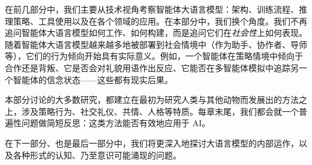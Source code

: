 在前几部分中，我们主要从技术视角考察智能体大语言模型：架构、训练流程、推理策略、工具使用以及在各个领域的应用。在本部分中，我们换个角度。我们不再追问智能体大语言模型如何工作、如何构建，而是追问它们在{\em 社会性}上如何表现。%
随着智能体大语言模型越来越多地被部署到社会情境中（作为助手、协作者、导师等），它们的行为倾向开始具有实际意义。例如，一个智能体在策略情境中倾向于合作还是背叛、它是否会对礼貌用语作出反应、它能否在多智能体模拟中追踪另一个智能体的信念状态——这些都有现实后果。  

本部分讨论的大多数研究，都建立在最初为研究人类与其他动物而发展出的方法之上，涉及策略行为、社交礼仪、共情、人格等特质。每章末尾，我们都会就一个普遍性问题做简短反思：这类方法能否有效地应用于 AI。  

在下一部分、也是最后一部分中，我们将更深入地探讨大语言模型的内部运作，以及各种形式的认知、乃至意识可能涌现的问题。
